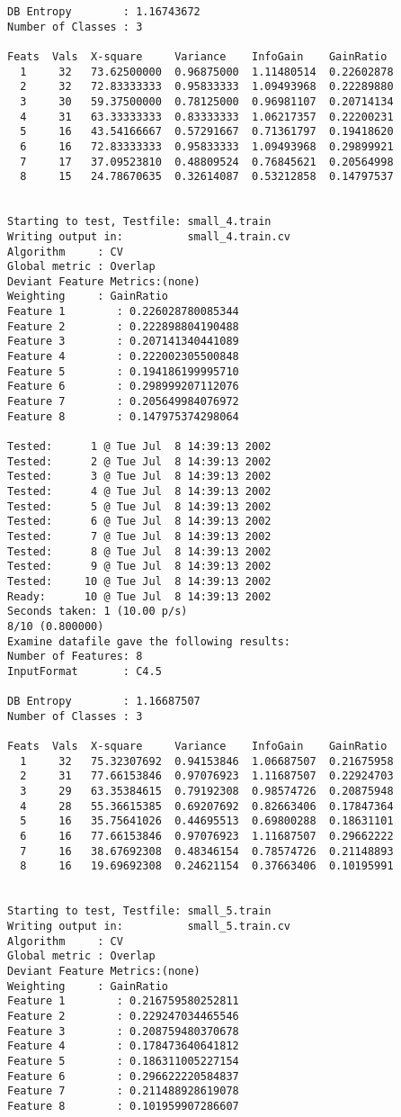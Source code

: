 \begin{verbatim}
DB Entropy        : 1.16743672
Number of Classes : 3

Feats  Vals  X-square     Variance    InfoGain    GainRatio
  1     32   73.62500000  0.96875000  1.11480514  0.22602878
  2     32   72.83333333  0.95833333  1.09493968  0.22289880
  3     30   59.37500000  0.78125000  0.96981107  0.20714134
  4     31   63.33333333  0.83333333  1.06217357  0.22200231
  5     16   43.54166667  0.57291667  0.71361797  0.19418620
  6     16   72.83333333  0.95833333  1.09493968  0.29899921
  7     17   37.09523810  0.48809524  0.76845621  0.20564998
  8     15   24.78670635  0.32614087  0.53212858  0.14797537


Starting to test, Testfile: small_4.train
Writing output in:          small_4.train.cv
Algorithm     : CV
Global metric : Overlap
Deviant Feature Metrics:(none)
Weighting     : GainRatio
Feature 1        : 0.226028780085344
Feature 2        : 0.222898804190488
Feature 3        : 0.207141340441089
Feature 4        : 0.222002305500848
Feature 5        : 0.194186199995710
Feature 6        : 0.298999207112076
Feature 7        : 0.205649984076972
Feature 8        : 0.147975374298064

Tested:      1 @ Tue Jul  8 14:39:13 2002
Tested:      2 @ Tue Jul  8 14:39:13 2002
Tested:      3 @ Tue Jul  8 14:39:13 2002
Tested:      4 @ Tue Jul  8 14:39:13 2002
Tested:      5 @ Tue Jul  8 14:39:13 2002
Tested:      6 @ Tue Jul  8 14:39:13 2002
Tested:      7 @ Tue Jul  8 14:39:13 2002
Tested:      8 @ Tue Jul  8 14:39:13 2002
Tested:      9 @ Tue Jul  8 14:39:13 2002
Tested:     10 @ Tue Jul  8 14:39:13 2002
Ready:      10 @ Tue Jul  8 14:39:13 2002
Seconds taken: 1 (10.00 p/s)
8/10 (0.800000)
Examine datafile gave the following results:
Number of Features: 8
InputFormat       : C4.5

DB Entropy        : 1.16687507
Number of Classes : 3

Feats  Vals  X-square     Variance    InfoGain    GainRatio
  1     32   75.32307692  0.94153846  1.06687507  0.21675958
  2     31   77.66153846  0.97076923  1.11687507  0.22924703
  3     29   63.35384615  0.79192308  0.98574726  0.20875948
  4     28   55.36615385  0.69207692  0.82663406  0.17847364
  5     16   35.75641026  0.44695513  0.69800288  0.18631101
  6     16   77.66153846  0.97076923  1.11687507  0.29662222
  7     16   38.67692308  0.48346154  0.78574726  0.21148893
  8     16   19.69692308  0.24621154  0.37663406  0.10195991


Starting to test, Testfile: small_5.train
Writing output in:          small_5.train.cv
Algorithm     : CV
Global metric : Overlap
Deviant Feature Metrics:(none)
Weighting     : GainRatio
Feature 1        : 0.216759580252811
Feature 2        : 0.229247034465546
Feature 3        : 0.208759480370678
Feature 4        : 0.178473640641812
Feature 5        : 0.186311005227154
Feature 6        : 0.296622220584837
Feature 7        : 0.211488928619078
Feature 8        : 0.101959907286607


\end{verbatim}
